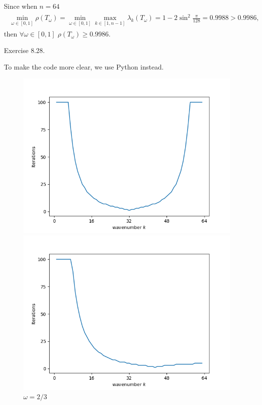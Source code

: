 \documentclass{homework}
\begin{document}
	Since when $n = 64$
	\begin{eqnarray}
		\begin{aligned}
			\min_{\omega\in[0,1]}\rho(T_\omega) = \min_{\omega\in[0,1]} \max_{k\in[1,n-1]} \lambda_k(T_\omega) = 1 - 2\sin^2 \frac{\pi}{128}
			= 0.9988 > 0.9986,
		\end{aligned}
	\end{eqnarray}
	then $\forall \omega\in[0,1]$ $\rho(T_\omega) \geq 0.9986$.
	
\question Exercise 8.28.

	To make the code more clear, we use Python instead.
	\begin{figure}[H]
		\begin{minipage}[t]{0.45\textwidth}
			\centering
			\includegraphics[scale = 0.5]{Ex8_28_a.png}
			\caption{$\omega = 1$}
		\end{minipage}
		\qquad
		\begin{minipage}[t]{0.45\textwidth}
			\centering
			\includegraphics[scale = 0.5]{Ex8_28_b.png}
			\caption{$\omega = 2/3$}
		\end{minipage}
	\end{figure}
	
	
\end{document}
